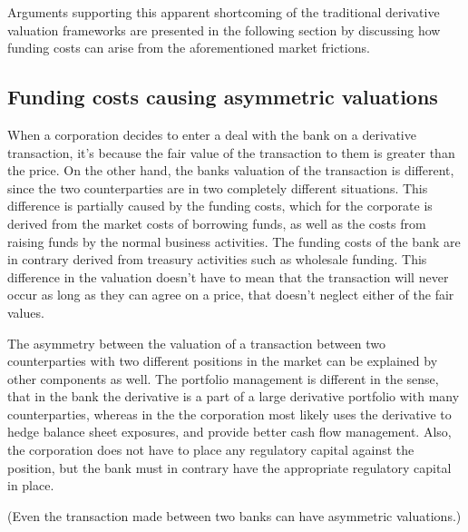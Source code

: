 \documentclass[./sub-main.tex]{subfiles}
\begin{document}
        Arguments supporting this apparent shortcoming of the traditional derivative valuation frameworks are presented in the following section by discussing how funding costs can arise from the aforementioned market frictions.
    
    \subsection{Funding costs causing asymmetric valuations}
        When a corporation decides to enter a deal with the bank on a derivative transaction,
        it's because the fair value of the transaction to them is greater than the price.
        On the other hand, the banks valuation of the transaction is different,
        since the two counterparties are in two completely different situations.
        This difference is partially caused by the funding costs,
        which for the corporate is derived from the market costs of borrowing funds,
        as well as the costs from raising funds by the normal business activities.
        The funding costs of the bank are in contrary derived from treasury activities such as wholesale funding.
        This difference in the valuation doesn't have to mean that the transaction will never occur 
        as long as they can agree on a price, that doesn't neglect either of the fair values.

        The asymmetry between the valuation of a transaction between two counterparties with two different positions in the market can be explained by other components as well.
        The portfolio management is different in the sense,
        that in the bank the derivative is a part of a large derivative portfolio with many counterparties,
        whereas in the the corporation most likely uses the derivative to hedge balance sheet exposures,
        and provide better cash flow management.
        Also, the corporation does not have to place any regulatory capital against the position,
        but the bank must in contrary have the appropriate regulatory capital in place.

        (Even the transaction made between two banks can have asymmetric valuations.)
\end{document}
